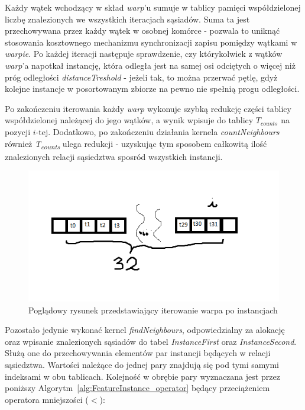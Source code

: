 \documentclass[12pt]{article}
\begin{document}
Każdy wątek wchodzący w skład \textit{warp}'u sumuje w tablicy pamięci współdzielonej liczbę znalezionych we wszystkich iteracjach sąsiadów. Suma ta jest przechowywana przez każdy wątek w osobnej komórce - pozwala to uniknąć stosowania kosztownego mechanizmu synchronizacji zapisu pomiędzy wątkami w \textit{warpie}. Po każdej iteracji następuje sprawdzenie, czy którykolwiek z wątków \textit{warp}'a napotkał instancję, która odległa jest na samej osi odciętych o więcej niż próg odległości \textit{distanceTreshold} - jeżeli tak, to można przerwać pętlę, gdyż kolejne instancje w posortowanym zbiorze na pewno nie spełnią progu odległości.

Po zakończeniu iterowania każdy \textit{warp} wykonuje szybką redukcję części tablicy współdzielonej należącej do jego wątków, a wynik wpisuje do tablicy \textit{$ T_{counts} $} na pozycji $i$-tej. Dodatkowo, po zakończeniu działania kernela  \textit{countNeighbours} również \textit{T\textsubscript{counts}} ulega redukcji - uzyskując tym sposobem całkowitą ilość znalezionych relacji sąsiedztwa sposród wszystkich instancji.


\begin{figure}[H]
\centering
\includegraphics{planesweep}
\caption{Poglądowy rysunek przedstawiający iterowanie warpa po instancjach}
\end{figure}

Pozostało jedynie wykonać kernel \textit{findNeighbours}, odpowiedzialny za alokację oraz wpisanie znalezionych sąsiadów do tabel \textit{InstanceFirst} oraz \textit{InstanceSecond}. Służą one do przechowywania elementów par instancji będących w relacji sąsiedztwa. Wartości należące do jednej pary znajdują się pod tymi samymi indeksami w obu tablicach. Kolejność w obrębie pary wyznaczana jest przez poniższy Algorytm~\ref{alg:FeatureInstance_operator} będący przeciążeniem operatora mniejszości ($ < $):
\end{document}
